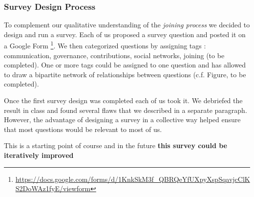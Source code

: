 \subsubsection{Survey Design Process}
To complement our qualitative understanding of the {\it joining process} we decided to design and run a survey. Each of us proposed a survey question and posted it on a Google Form \footnote{\url{https://docs.google.com/forms/d/1KnkSkM3f_QBRQeYfUXpyXspSqavjcClKS2DoWAz1fyE/viewform}}. We then categorized questions by assigning tags : communication, governance, contributions, social networks, joining (to be completed). One or more tags could be assigned to one question and has allowed to draw a bipartite network of relationships between questions (c.f. Figure, to be completed).

Once the first survey design was completed each of us took it. We debriefed the result in class and found several flaws that we described in a separate paragraph. However, the advantage of designing a survey in a collective way helped ensure that most questions would be relevant to most of us.

This is a starting point of course and in the future {\bf this survey could be iteratively improved}


